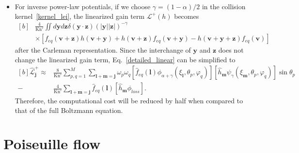 \begin{itemize}
	\item For inverse power-law potentials, if we choose $\gamma=(1-\alpha)/2$ in the collision kernel~\eqref{kernel_lei}, the linearized gain term $\mathcal{L}^+(h)$ becomes
\begin{equation*}
\begin{aligned}[b]
&\frac{4}{\text{Kn}'}\iint{d\bm{y} d\bm{z}}\delta(\bm{y}\cdot{}\bm{z})(|\bm{y}||\bm{z}|)^{-\gamma}\\ &\times[f_{eq}(\bm{v}+\bm{z})h(\bm{v}+\bm{y})+h(\bm{v}+\bm{z})f_{eq}(\bm{v}+\bm{y})
-h(\bm{v}+\bm{y}+\bm{z})f_{eq}(\bm{v})]
\end{aligned}
\end{equation*}
after the Carleman representation. Since the interchange of $\bm{y}$ and $\bm{z}$ does not change the linearized gain term, Eq.~\eqref{detailed_linear} can be simplified to 
\begin{equation}\label{detailed_linear_half}
\begin{aligned}[b]
\widehat{\mathcal{L}}^+_{\bm{j}}\approx &\frac{8}{\text{Kn}'}\sum_{p,q=1}^{M} \sum_{\bm{l}+\bm{m}=\bm{j} }\omega_p\omega_q[\hat{f}_{eq}(\bm{l}){\phi_{\alpha+\gamma}(\xi_{\bm{l}},\theta_p,\varphi_q)}][\hat{h}_{\bm{m}}{\psi_{\gamma}(\xi_{\bm{m}},\theta_p,\varphi_q)}]\sin\theta_p\\
-&\frac{4}{\text{Kn}'}\sum_{\bm{l}+\bm{m}=\bm{j} }\hat{f}_{eq}(\bm{l})[\hat{h}_{\bm{m}}{\phi_{loss}}]. 
\end{aligned}
\end{equation}
Therefore, the computational cost will be reduced by half when compared to that of the full Boltzmann equation. 

\end{itemize}

\section{Poiseuille flow }
\label{FSM_linear_Poiseuille}

